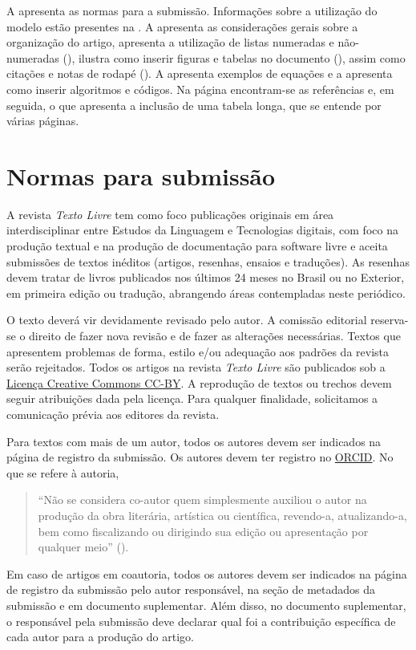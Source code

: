 \documentclass[portuguese]{textolivre}
\begin{document}
A  apresenta as normas para a submissão. Informações sobre a utilização do modelo
estão presentes na . A  apresenta as considerações gerais sobre a organização do artigo,
apresenta a utilização de listas numeradas e não-numeradas (),
ilustra como inserir figuras e tabelas no documento (), assim como citações
e notas de rodapé (). A  apresenta exemplos de equações
e a  apresenta como inserir algoritmos e códigos.
Na página \pageref{sec-bib} encontram-se as referências e, em seguida, o  que
apresenta a inclusão de uma tabela longa, que se entende por várias páginas.

\lipsum[1-5]

\section{Normas para submissão}\label{sec-normas}
A revista \emph{Texto Livre} tem como foco publicações originais em área interdisciplinar entre
Estudos da Linguagem e Tecnologias digitais, com foco na produção textual e na produção de
documentação para software livre e aceita submissões de textos inéditos (artigos, resenhas, ensaios e traduções).
As resenhas devem tratar de livros publicados nos últimos 24 meses no Brasil ou no Exterior,
em primeira edição ou tradução, abrangendo áreas contempladas neste periódico.

O texto deverá vir devidamente revisado pelo autor. A comissão editorial reserva-se o direito de
fazer nova revisão e de fazer as alterações necessárias. Textos que apresentem problemas de forma,
estilo e/ou adequação aos padrões da revista serão rejeitados.
Todos os artigos na revista \emph{Texto Livre} são publicados sob
a \href{https://creativecommons.org/}{Licença Creative Commons CC-BY}.
A reprodução de textos ou trechos devem seguir atribuições dada pela licença.
Para qualquer finalidade, solicitamos a comunicação prévia aos editores da revista.

Para textos com mais de um autor, todos os autores devem ser indicados na página de registro da submissão.
Os autores devem ter registro no \href{https://orcid.org/}{ORCID}. No que se refere à autoria,
\begin{quote}
``Não se considera co-autor quem simplesmente auxiliou o autor na produção da obra literária, artística ou científica,
revendo-a, atualizando-a, bem como fiscalizando ou dirigindo sua edição ou apresentação por qualquer meio'' ().
\end{quote}
Em caso de artigos em coautoria, todos os autores devem ser indicados na página de registro da submissão pelo autor
responsável, na seção de metadados da submissão e em documento suplementar. Além disso, no documento suplementar,
o responsável pela submissão deve declarar qual foi a contribuição específica de cada autor para a produção do artigo.
\end{document}
